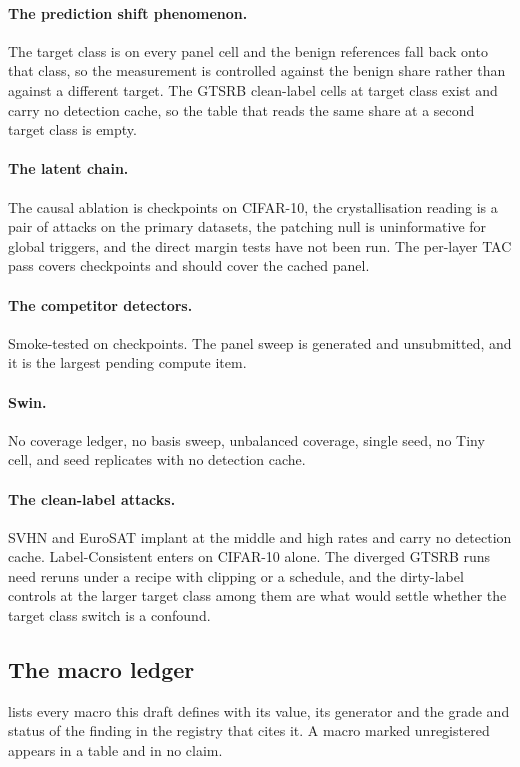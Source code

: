 \documentclass[../main.tex]{subfiles}
\begin{document}
\paragraph{The prediction shift phenomenon.} The target class is \PanelTargetLabel{} on every panel cell and the benign references fall back onto that class, so the measurement is controlled against the benign share rather than against a different target. The GTSRB clean-label cells at target class \SigGtsrbTargetClass{} exist and carry no detection cache, so the table that reads the same share at a second target class is empty.

\paragraph{The latent chain.} The causal ablation is \AblationCheckpoints{} checkpoints on CIFAR-10, the crystallisation reading is a pair of attacks on the primary datasets, the patching null is uninformative for global triggers, and the direct margin tests have not been run. The per-layer TAC pass covers \TacLayersCheckpoints{} checkpoints and should cover the cached panel.

\paragraph{The competitor detectors.} Smoke-tested on \SmokeCheckpoints{} checkpoints. The panel sweep is generated and unsubmitted, and it is the largest pending compute item.

\paragraph{Swin.} No coverage ledger, no basis sweep, unbalanced coverage, single seed, no Tiny cell, and \SwinSeedReplicates{} seed replicates with no detection cache.

\paragraph{The clean-label attacks.} SVHN and EuroSAT implant at the middle and high rates and carry no detection cache. Label-Consistent enters on CIFAR-10 alone. The \GtsrbDivergedRuns{} diverged GTSRB runs need reruns under a recipe with clipping or a schedule, and the dirty-label controls at the larger target class among them are what would settle whether the target class switch is a confound.

\subsection{The macro ledger}

 lists every macro this draft defines with its value, its generator and the grade and status of the finding in the registry that cites it. A macro marked unregistered appears in a table and in no claim.


\end{document}
